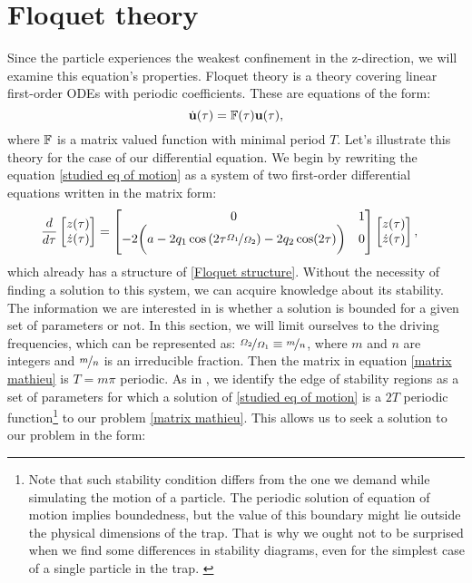 \section{Floquet theory}
\label{sec:floquet}


Since the particle experiences the weakest confinement in the z-direction, we will examine this equation's properties. Floquet theory is a theory covering linear first-order ODEs with periodic coefficients. These are equations of the form:
\begin{equation}
	\label{Floquet structure}
	\dot{\vb{u}}(\tau) = \mathbb{F}(\tau) \vb{u}(\tau),
\end{equation}
where $\mathbb{F}$ is a matrix valued function with minimal period $T$. Let's illustrate this theory for the case of our differential equation. We begin by rewriting the equation \eqref{studied eq of motion} as a system of two first-order differential equations written in the matrix form:
\begin{align}
\label{matrix mathieu}
	\frac{d}{d \tau}
	\begin{bmatrix}
		z(\tau) \\
		\dot{z}(\tau)
	\end{bmatrix}	
	&=
	\begin{bmatrix}
		0 & 1 \\
		-2\bigg( a - 2 q_1 \cos\left(2 \tau \nicefrac{\Omega_1}{\Omega_2} \right) - 2 q_2 \cos(2\tau) \bigg) & 0	
	\end{bmatrix}
	\begin{bmatrix}
		z(\tau) \\
		\dot{z}(\tau)
	\end{bmatrix},
\end{align}
which already has a structure of \eqref{Floquet structure}. Without the necessity of finding a solution to this system, we can acquire knowledge about its stability. The information we are interested in is whether a solution is bounded for a given set of parameters or not. In this section, we will limit ourselves to the driving frequencies, which can be represented as: $\nicefrac{\Omega_2}{\Omega_1} \equiv \nicefrac{m}{n}$, where $m$ and $n$ are integers and $\nicefrac{m}{n}$ is an irreducible fraction. Then the matrix in equation \eqref{matrix mathieu} is $T = m \pi$ periodic. As in \cite{leefer2017investigation}, we identify the edge of stability regions as a set of parameters for which a solution of \eqref{studied eq of motion} is a $2T$ periodic function\footnote{Note that such stability condition differs from the one we demand while simulating the motion of a particle. The periodic solution of equation of motion implies boundedness, but the value of this boundary might lie outside the physical dimensions of the trap. That is why we ought not to be surprised when we find some differences in stability diagrams, even for the simplest case of a single particle in the trap. \label{foot: different stability condition}} to our problem \eqref{matrix mathieu}. This allows us to seek a solution to our problem in the form:
